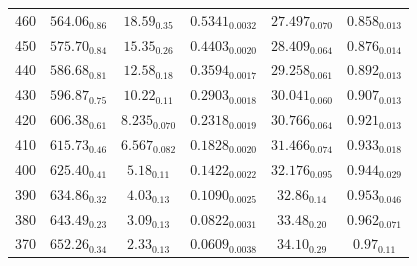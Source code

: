 \documentclass[journal=jctc,manuscript=article]{achemso}
\begin{document}
\begin{table}[htb!]
\begin{center}
\begin{tabular}{|c|c|c|c|c|c|}
			460 & $564.06_{0.86}$ & $18.59_{0.35}$ & $0.5341_{0.0032}$ & $27.497_{0.070}$ & $0.858_{0.013}$ \\
			450 & $575.70_{0.84}$ & $15.35_{0.26}$ & $0.4403_{0.0020}$ & $28.409_{0.064}$ & $0.876_{0.014}$ \\
			440 & $586.68_{0.81}$ & $12.58_{0.18}$ & $0.3594_{0.0017}$ & $29.258_{0.061}$ & $0.892_{0.013}$ \\
			430 & $596.87_{0.75}$ & $10.22_{0.11}$ & $0.2903_{0.0018}$ & $30.041_{0.060}$ & $0.907_{0.013}$ \\
			420 & $606.38_{0.61}$ & $8.235_{0.070}$ & $0.2318_{0.0019}$ & $30.766_{0.064}$ & $0.921_{0.013}$ \\
			410 & $615.73_{0.46}$ & $6.567_{0.082}$ & $0.1828_{0.0020}$ & $31.466_{0.074}$ & $0.933_{0.018}$ \\
			400 & $625.40_{0.41}$ & $5.18_{0.11}$ & $0.1422_{0.0022}$ & $32.176_{0.095}$ & $0.944_{0.029}$ \\
			390 & $634.86_{0.32}$ & $4.03_{0.13}$ & $0.1090_{0.0025}$ & $32.86_{0.14}$ & $0.953_{0.046}$ \\
			380 & $643.49_{0.23}$ & $3.09_{0.13}$ & $0.0822_{0.0031}$ & $33.48_{0.20}$ & $0.962_{0.071}$ \\
			370 & $652.26_{0.34}$ & $2.33_{0.13}$ & $0.0609_{0.0038}$ & $34.10_{0.29}$ & $0.97_{0.11}$ \\
			\hline
		\end{tabular}
	\end{center}
\end{table}
\end{document}
